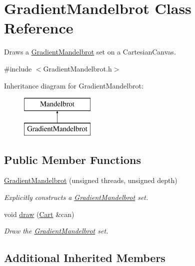 \hypertarget{class_gradient_mandelbrot}{}\section{Gradient\+Mandelbrot Class Reference}
\label{class_gradient_mandelbrot}


Draws a \hyperlink{class_gradient_mandelbrot}{Gradient\+Mandelbrot} set on a Cartesian\+Canvas.  




{\ttfamily \#include $<$Gradient\+Mandelbrot.\+h$>$}

Inheritance diagram for Gradient\+Mandelbrot\+:\begin{figure}[H]
\begin{center}
\leavevmode
\includegraphics[height=2.000000cm]{class_gradient_mandelbrot}
\end{center}
\end{figure}
\subsection*{Public Member Functions}
\begin{DoxyCompactItemize}
\item 
\hyperlink{class_gradient_mandelbrot_a4284747d6cef5b030fc82ffea41c850d}{Gradient\+Mandelbrot} (unsigned threads, unsigned depth)
\begin{DoxyCompactList}\small\item\em Explicitly constructs a \hyperlink{class_gradient_mandelbrot}{Gradient\+Mandelbrot} set. \end{DoxyCompactList}\item 
void \hyperlink{class_gradient_mandelbrot_a1d4aa3e44d7d1c2241545b60c79985df}{draw} (\hyperlink{classtsgl_1_1_cartesian_canvas}{Cart} \&can)
\begin{DoxyCompactList}\small\item\em Draw the \hyperlink{class_gradient_mandelbrot}{Gradient\+Mandelbrot} set. \end{DoxyCompactList}\end{DoxyCompactItemize}
\subsection*{Additional Inherited Members}


